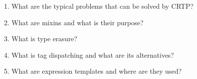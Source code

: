 \begin{enumerate}
\item
What are the typical problems that can be solved by CRTP?

\item
What are mixins and what is their purpose?

\item
What is type erasure?

\item
What is tag dispatching and what are its alternatives?

\item
What are expression templates and where are they used?
\end{enumerate}